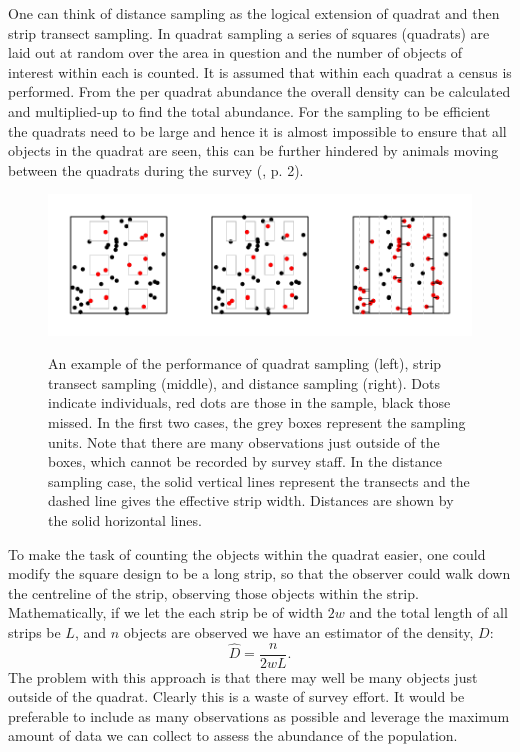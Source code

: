 One can think of distance sampling as the logical extension of quadrat and then strip transect sampling. In quadrat sampling a series of squares (quadrats) are laid out at random over the area in question and the number of objects of interest within each is counted. It is assumed that within each quadrat a census is performed. From the per quadrat abundance the overall density can be calculated and multiplied-up to find the total abundance. For the sampling to be efficient the quadrats need to be large and hence it is almost impossible to ensure that all objects in the quadrat are seen, this can be further hindered by animals moving between the quadrats during the survey (\cite{IDS}, p. 2).

\begin{figure}
\centering
\includegraphics{intro/figs/quadrat-to-ds.pdf}\\
\caption{An example of the performance of quadrat sampling (left), strip transect sampling (middle), and distance sampling (right). Dots indicate individuals, red dots are those in the sample, black those missed. In the first two cases, the grey boxes represent the sampling units. Note that there are many observations just outside of the boxes, which cannot be recorded by survey staff. In the distance sampling case, the solid vertical lines represent the transects and the dashed line gives the effective strip width. Distances are shown by the solid horizontal lines.}
\label{quad-to-ds}
\end{figure}

To make the task of counting the objects within the quadrat easier, one could modify the square design to be a long strip, so that the observer could walk down the centreline of the strip, observing those objects within the strip. Mathematically, if we let the each strip be of width $2w$ and the total length of all strips be $L$, and $n$ objects are observed we have an estimator of the density, $D$:
\begin{equation}
\hat{D}=\frac{n}{2wL}.
\label{ds-simpleD}
\end{equation}
The problem with this approach is that there may well be many objects just outside of the quadrat. Clearly this is a waste of survey effort. It would be preferable to include as many observations as possible and leverage the maximum amount of data we can collect to assess the abundance of the population.


